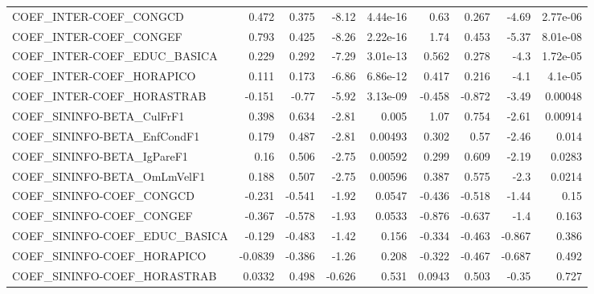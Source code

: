 \begin{tabular}{lrrrrrrrr}
COEF\_INTER-COEF\_CONGCD                &       0.472 &        0.375 &   -8.12 & 4.44e-16 &       0.63 &       0.267 &        -4.69 &      2.77e-06 \\
COEF\_INTER-COEF\_CONGEF                &       0.793 &        0.425 &   -8.26 & 2.22e-16 &       1.74 &       0.453 &        -5.37 &      8.01e-08 \\
COEF\_INTER-COEF\_EDUC\_BASICA           &       0.229 &        0.292 &   -7.29 & 3.01e-13 &      0.562 &       0.278 &         -4.3 &      1.72e-05 \\
COEF\_INTER-COEF\_HORAPICO              &       0.111 &        0.173 &   -6.86 & 6.86e-12 &      0.417 &       0.216 &         -4.1 &       4.1e-05 \\
COEF\_INTER-COEF\_HORASTRAB             &      -0.151 &        -0.77 &   -5.92 & 3.13e-09 &     -0.458 &      -0.872 &        -3.49 &       0.00048 \\
COEF\_SININFO-BETA\_CulFrF1             &       0.398 &        0.634 &   -2.81 &    0.005 &       1.07 &       0.754 &        -2.61 &       0.00914 \\
COEF\_SININFO-BETA\_EnfCondF1           &       0.179 &        0.487 &   -2.81 &  0.00493 &      0.302 &        0.57 &        -2.46 &         0.014 \\
COEF\_SININFO-BETA\_IgPareF1            &        0.16 &        0.506 &   -2.75 &  0.00592 &      0.299 &       0.609 &        -2.19 &        0.0283 \\
COEF\_SININFO-BETA\_OmLmVelF1           &       0.188 &        0.507 &   -2.75 &  0.00596 &      0.387 &       0.575 &         -2.3 &        0.0214 \\
COEF\_SININFO-COEF\_CONGCD              &      -0.231 &       -0.541 &   -1.92 &   0.0547 &     -0.436 &      -0.518 &        -1.44 &          0.15 \\
COEF\_SININFO-COEF\_CONGEF              &      -0.367 &       -0.578 &   -1.93 &   0.0533 &     -0.876 &      -0.637 &         -1.4 &         0.163 \\
COEF\_SININFO-COEF\_EDUC\_BASICA         &      -0.129 &       -0.483 &   -1.42 &    0.156 &     -0.334 &      -0.463 &       -0.867 &         0.386 \\
COEF\_SININFO-COEF\_HORAPICO            &     -0.0839 &       -0.386 &   -1.26 &    0.208 &     -0.322 &      -0.467 &       -0.687 &         0.492 \\
COEF\_SININFO-COEF\_HORASTRAB           &      0.0332 &        0.498 &  -0.626 &    0.531 &     0.0943 &       0.503 &        -0.35 &         0.727 \\

\end{tabular}
